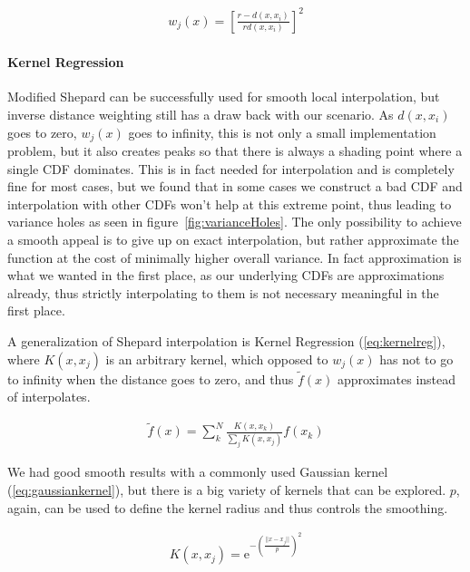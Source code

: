 \begin{align}\label{eq:modshep}
w_j(x) = \left[ \frac{ r - d(x, x_i)}{ rd(x, x_i) } \right]^2
\end{align}

\paragraph{Kernel Regression}

Modified Shepard can be successfully used for smooth local interpolation, but inverse distance weighting still has a draw back with our scenario. As $d(x, x_i)$ goes to zero, $w_j(x)$ goes to infinity, this is not only a small implementation problem, but it also creates peaks so that there is always a shading point where a single CDF dominates. This is in fact needed for interpolation and is completely fine for most cases, but we found that in some cases we construct a bad CDF and interpolation with other CDFs won't help at this extreme point, thus leading to variance holes as seen in figure~\ref{fig:varianceHoles}. The only possibility to achieve a smooth appeal is to give up on exact interpolation, but rather approximate the function at the cost of minimally higher overall variance. In fact approximation is what we wanted in the first place, as our underlying CDFs are approximations already, thus strictly interpolating to them is not necessary meaningful in the first place.

A generalization of Shepard interpolation is Kernel Regression (\ref{eq:kernelreg}), where $K(x, x_j)$ is an arbitrary kernel, which opposed to $w_j(x)$ has not to go to infinity when the distance goes to zero, and thus $\widetilde{f}(x)$ approximates instead of interpolates. 

\begin{align}\label{eq:kernelreg}
\widetilde{f}(x) = \sum_{k}^{N}\frac{K(x,x_k)}{\sum\nolimits_{j}K(x, x_j)}f(x_k)
\end{align}

We had good smooth results with a commonly used Gaussian kernel (\ref{eq:gaussiankernel}), but there is a big variety of kernels that can be explored. $p$, again, can be used to define the kernel radius and thus controls the smoothing.

\begin{align}\label{eq:gaussiankernel}
K(x, x_j) = \mathrm{e}^{-\left(\frac{||x-x_j||}{p}\right)^2}
\end{align}

